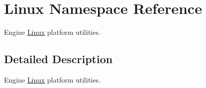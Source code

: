 \hypertarget{namespaceLinux}{}\section{Linux Namespace Reference}
\label{namespaceLinux}


Engine \hyperlink{namespaceLinux}{Linux} platform utilities.  




\subsection{Detailed Description}
Engine \hyperlink{namespaceLinux}{Linux} platform utilities. 